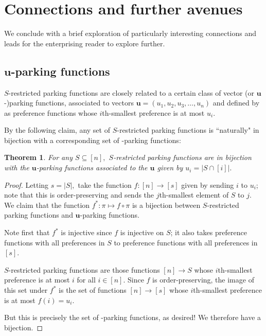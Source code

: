 \documentclass[12 pt]{amsart}
\newtheorem{theorem}{Theorem}[section]
\theoremstyle{definition} %
\theoremstyle{remark} %
\begin{document}
\section{Connections and further avenues}

We conclude with a brief exploration of particularly interesting connections and leads for the enterprising reader to explore further.

\subsection{$\mathbf{u}$-parking functions}

$S$-restricted parking functions are closely related to a certain class of vector (or $\mathbf{u}$-)parking functions, associated to vectors $\mathbf{u}=(u_1,u_2,u_3,\ldots,u_n)$ and defined by \cite{} as preference functions whose $i$th-smallest preference is at most $u_i.$

By the following claim, any set of $S$-restricted parking functions is ``naturally" in bijection with a corresponding set of -parking functions:

\begin{theorem}
    For any $S\subseteq[n],$ $S$-restricted parking functions are in bijection with the $\mathbf{u}$-parking functions associated to the $\mathbf{u}$ given by $u_i=|S\cap [i]|.$
\end{theorem}
\begin{proof}
    Letting $s=|S|,$ take the function $f:[n]\to [s]$ given by sending $i$ to $u_i$; note that this is order-preserving and sends the $j$th-smallest element of $S$ to $j$. We claim that the function $f^*: \pi\mapsto f\circ \pi$ is a bijection between $S$-restricted parking functions and $\mathbf{u}$-parking functions.

    Note first that $f^*$ is injective since $f$ is injective on $S$; it also takes preference functions with all preferences in $S$ to preference functions with all preferences in $[s].$
    
    $S$-restricted parking functions are those functions $[n]\to S$ whose $i$th-smallest preference is at most $i$ for all $i\in [n]$. Since $f$ is order-preserving, the image of this set under $f^*$ is the set of functions $[n]\to [s]$ whose $i$th-smallest preference is at most $f(i)=u_i.$

    But this is precisely the set of -parking functions, as desired! We therefore have a bijection.
\end{proof}
\end{document}
